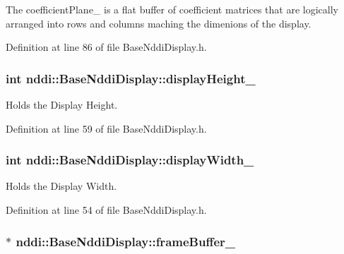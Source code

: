 The coefficientPlane\_\- is a flat buffer of coefficient matrices that are logically arranged into rows and columns maching the dimenions of the display. 



Definition at line 86 of file BaseNddiDisplay.h.

\hypertarget{classnddi_1_1_base_nddi_display_a462ed74e3bd5ee923079badb352f7e97}{
\subsubsection[{displayHeight\_\-}]{\setlength{\rightskip}{0pt plus 5cm}int {\bf nddi::BaseNddiDisplay::displayHeight\_\-}}}
\label{classnddi_1_1_base_nddi_display_a462ed74e3bd5ee923079badb352f7e97}


Holds the Display Height. 



Definition at line 59 of file BaseNddiDisplay.h.

\hypertarget{classnddi_1_1_base_nddi_display_ad9b1e0726fddd57b58f37624a72c7fe5}{
\subsubsection[{displayWidth\_\-}]{\setlength{\rightskip}{0pt plus 5cm}int {\bf nddi::BaseNddiDisplay::displayWidth\_\-}}}
\label{classnddi_1_1_base_nddi_display_ad9b1e0726fddd57b58f37624a72c7fe5}


Holds the Display Width. 



Definition at line 54 of file BaseNddiDisplay.h.

\hypertarget{classnddi_1_1_base_nddi_display_adacb4f49d53e9ac1ee88f438554d4a5c}{
\subsubsection[{frameBuffer\_\-}]{$\ast$ {\bf nddi::BaseNddiDisplay::frameBuffer\_\-}}}
\label{classnddi_1_1_base_nddi_display_adacb4f49d53e9ac1ee88f438554d4a5c}


